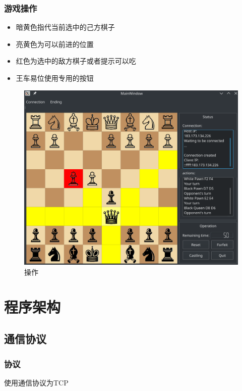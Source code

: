 \documentclass[a4paper,10pt]{article}
\begin{document}
                \subsubsection{游戏操作}
                        \begin{itemize}
                         \item 暗黄色指代当前选中的己方棋子
                         \item 亮黄色为可以前进的位置
                         \item 红色为选中的敌方棋子或者提示可以吃
                         \item 王车易位使用专用的按钮
                        \end{itemize}
                        \begin{figure}[htbp]
                                \centering
                                \includegraphics[width=.8\textwidth]{control.png}
                                \caption{操作}
                                \label{fig8}
                        \end{figure}


\section{程序架构}
        \subsection{通信协议}
                \subsubsection{协议}
                        使用通信协议为TCP
\end{document}
